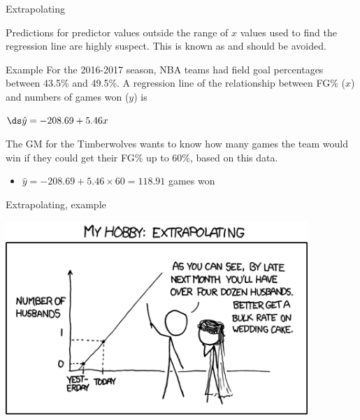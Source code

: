 \documentclass[xcolor=table]{beamer}
\begin{document}
\begin{frame}{Extrapolating}
\begin{block}{}
\large
Predictions for predictor values outside the range of $x$ values used to find the regression line are highly suspect. This is known as  and should be avoided.
\end{block}

\pause
\begin{exampleblock}{Example}
\large
For the 2016-2017 season, NBA teams had field goal percentages between 43.5\% and 49.5\%. A regression line of the relationship between FG\% ($x$) and numbers of games won ($y$) is  \\
\smallskip
{\centering
$\ds \hat y = -208.69 + 5.46 x$
\par}
\smallskip
The GM for the Timberwolves wants to know how many games the team would win if they could get their FG\% up to 60\%, based on this data.
\begin{itemize}
\pause\item $\hat y = -208.69 + 5.46 \times 60 = 118.91$ games won
\end{itemize}

\end{exampleblock}

\end{frame}

\begin{frame}{Extrapolating, example}

{\centering
\includegraphics[width=4.5in]{../images/ch10_extrapolating}
\par}
\end{frame}
\end{document}
